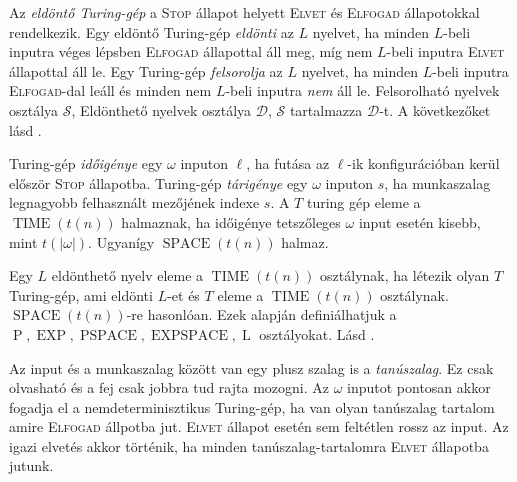 \documentclass[%
	DIV=15,appendixprefix]{scrreprt}
\theoremstyle{definition}
\theoremstyle{remark}
\DeclareMathOperator{\Pbonya}{P}
\DeclareMathOperator{\EXP}{EXP}
\DeclareMathOperator{\PSPACE}{PSPACE}
\DeclareMathOperator{\EXPSPACE}{EXPSPACE}
\DeclareMathOperator{\Lbonya}{L}
\DeclareMathOperator{\TIME}{TIME}
\DeclareMathOperator{\SPACE}{SPACE}
\begin{document}
Az \emph{eldöntő Turing-gép} a \textsc{Stop} állapot helyett
\textsc{Elvet} és \textsc{Elfogad} állapotokkal rendelkezik. Egy eldöntő Turing-gép \emph{eldönti}
az $L$ nyelvet, ha minden $L$-beli inputra véges lépsben \textsc{Elfogad} állapottal áll meg, míg
nem $L$-beli inputra \textsc{Elvet} állapottal áll le. Egy Turing-gép \emph{felsorolja} az $L$
nyelvet, ha minden $L$-beli inputra \textsc{Elfogad}-dal leáll és minden nem $L$-beli inputra
\emph{nem} áll le. Felsorolható nyelvek osztálya $ \mathcal{ S } $, Eldönthető nyelvek osztálya
$\mathcal{ D }$, $\mathcal{ S }$ tartalmazza $\mathcal{ D }$-t.
%
A következőket lásd
\cite[\href{http://www.math.u-szeged.hu/~hajnal/courses/MSc_Bonyolultsag/ea02.pdf}{
\emph{Bonyolultsági osztályok, Turing-gép fogalmának változatai\ldots}}]{Bonya}.

Turing-gép \emph{időigénye} egy $\omega$ inputon $\ell$, ha futása az $\ell$-ik konfigurációban
kerül először \textsc{Stop} állapotba. Turing-gép \emph{tárigénye} egy $\omega$ inputon $s$, ha
munkaszalag legnagyobb felhasznált mezőjének indexe $s$. A $T$ turing gép eleme a $ \TIME \left( t
\left( n \right) \right) $ halmaznak, ha időigénye tetszőleges $\omega$ input esetén kisebb, mint
$ t \left( \left| \omega \right|  \right)  $. Ugyanígy $ \SPACE \left( t \left( n \right) \right) $
halmaz.

Egy $L$ eldönthető nyelv eleme a $ \TIME \left( t \left( n \right) \right) $ osztálynak, ha létezik
olyan $T$ Turing-gép, ami eldönti $L$-et és $T$ eleme a $ \TIME \left( t \left( n \right) \right) $
osztálynak. $ \SPACE \left( t \left( n \right) \right) $-re hasonlóan. Ezek alapján definiálhatjuk a
$\Pbonya, \EXP, \PSPACE, \EXPSPACE, \Lbonya$ osztályokat.
%
Lásd
\cite[\href{http://www.math.u-szeged.hu/~hajnal/courses/MSc_Bonyolultsag/ea03.pdf}{
\emph{Nem-determinizmus, Bonyolultsági osztályok\ldots}}]{Bonya}.

Az input és a munkaszalag között van egy plusz szalag is a \emph{tanúszalag}. Ez csak olvasható és a
fej csak jobbra tud rajta mozogni. Az $\omega$ inputot pontosan akkor fogadja el a
nemdeterminisztikus Turing-gép, ha van olyan tanúszalag tartalom amire \textsc{Elfogad} állpotba
jut. \textsc{Elvet} állapot esetén sem feltétlen rossz az input. Az igazi elvetés akkor történik, ha
minden tanúszalag-tartalomra \textsc{Elvet} állapotba jutunk.
\end{document}

